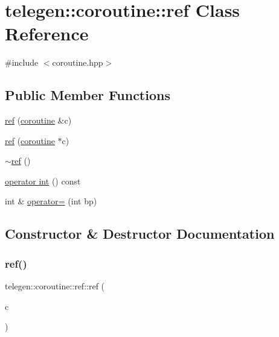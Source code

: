 \hypertarget{classtelegen_1_1coroutine_1_1ref}{}\section{telegen\+:\+:coroutine\+:\+:ref Class Reference}
\label{classtelegen_1_1coroutine_1_1ref}


{\ttfamily \#include $<$coroutine.\+hpp$>$}

\subsection*{Public Member Functions}
\begin{DoxyCompactItemize}
\item 
\hyperlink{classtelegen_1_1coroutine_1_1ref_a04d38625676996ee154a2228496b4ed0}{ref} (\hyperlink{structtelegen_1_1coroutine}{coroutine} \&c)
\item 
\hyperlink{classtelegen_1_1coroutine_1_1ref_a40fa879f483f552a0de04d2047d3fb00}{ref} (\hyperlink{structtelegen_1_1coroutine}{coroutine} $\ast$c)
\item 
\hyperlink{classtelegen_1_1coroutine_1_1ref_a4e11df44835cad42e04f9eebe7096dbd}{$\sim$ref} ()
\item 
\hyperlink{classtelegen_1_1coroutine_1_1ref_a40534b7249731bd182032f2175080d2f}{operator int} () const
\item 
int \& \hyperlink{classtelegen_1_1coroutine_1_1ref_a4df06629c2ca9c502184c8e066c64213}{operator=} (int bp)
\end{DoxyCompactItemize}


\subsection{Constructor \& Destructor Documentation}
\mbox{\label{classtelegen_1_1coroutine_1_1ref_a04d38625676996ee154a2228496b4ed0}} 
\subsubsection{\texorpdfstring{ref()}{ref()}\hspace{0.1cm}{\footnotesize\ttfamily [1/2]}}
{\footnotesize\ttfamily telegen\+::coroutine\+::ref\+::ref (\begin{DoxyParamCaption}\item[{\hyperlink{structtelegen_1_1coroutine}{coroutine} \&}]{c }\end{DoxyParamCaption})\hspace{0.3cm}{\ttfamily [inline]}}

